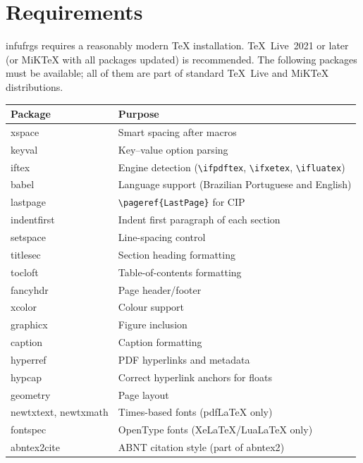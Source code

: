 \documentclass[11pt,a4paper]{article}
\newcommand{\pkg}[1]{\textsf{#1}}
\newcommand{\cls}[1]{\textsf{#1}}
\newcommand{\cmd}[1]{\texttt{\textbackslash #1}}
\begin{document}
\section{Requirements}
\label{sec:requirements}

\cls{infufrgs} requires a reasonably modern TeX installation.
TeX~Live~2021 or later (or MiK\TeX{} with all packages updated) is
recommended.  The following packages must be available; all of them
are part of standard TeX~Live and MiK\TeX{} distributions.

\begin{center}
\begin{tabular}{@{}ll@{}}
  \toprule
  Package & Purpose \\
  \midrule
  \pkg{xspace}       & Smart spacing after macros \\
  \pkg{keyval}       & Key–value option parsing \\
  \pkg{iftex}        & Engine detection (\cmd{ifpdftex}, \cmd{ifxetex}, \cmd{ifluatex}) \\
  \pkg{babel}        & Language support (Brazilian Portuguese and English) \\
  \pkg{lastpage}     & \verb|\pageref{LastPage}| for CIP \\
  \pkg{indentfirst}  & Indent first paragraph of each section \\
  \pkg{setspace}     & Line-spacing control \\
  \pkg{titlesec}     & Section heading formatting \\
  \pkg{tocloft}      & Table-of-contents formatting \\
  \pkg{fancyhdr}     & Page header/footer \\
  \pkg{xcolor}       & Colour support \\
  \pkg{graphicx}     & Figure inclusion \\
  \pkg{caption}      & Caption formatting \\
  \pkg{hyperref}     & PDF hyperlinks and metadata \\
  \pkg{hypcap}       & Correct hyperlink anchors for floats \\
  \pkg{geometry}     & Page layout \\
  \pkg{newtxtext}, \pkg{newtxmath} & Times-based fonts (pdf\LaTeX{} only) \\
  \pkg{fontspec}     & OpenType fonts (Xe\LaTeX/Lua\LaTeX{} only) \\
  \pkg{abntex2cite}  & ABNT citation style (part of \pkg{abntex2}) \\
  \bottomrule
\end{tabular}
\end{center}
\end{document}
